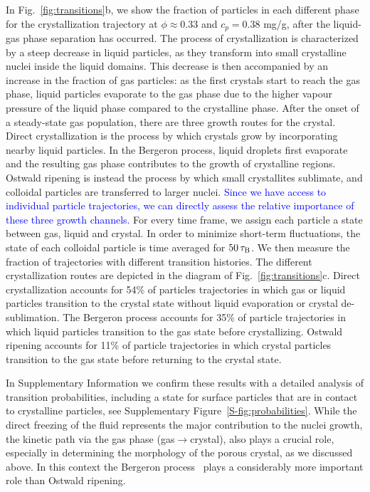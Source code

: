 \documentclass[preprint,amsmath,amssymb,superscriptaddress]{revtex4-1}
\begin{document}
In Fig.~\ref{fig:transitions}b, we show  the fraction of particles in each different phase for the crystallization trajectory at
$\phi\approx 0.33$ and $c_p=0.38$ mg/g, after the liquid-gas phase separation has occurred.
The process of crystallization is characterized 
by a steep decrease in liquid particles, as they transform into small crystalline nuclei inside the liquid domains. This decrease
is then accompanied by an increase in the fraction of gas particles: as the first crystals start to reach the gas phase, liquid particles evaporate 
to the gas phase due to the higher vapour pressure of the liquid phase compared to the crystalline phase. 
After the onset of a steady-state gas population, there are three growth routes for the crystal. 
Direct crystallization is the process by which crystals grow by incorporating nearby liquid particles. 
In the Bergeron process, liquid droplets first evaporate and the resulting gas phase contributes to the growth of crystalline regions. Ostwald ripening is instead the process by which small crystallites sublimate, and colloidal particles are transferred to larger nuclei.
\textcolor{blue}{Since we have access to individual particle trajectories, we can directly assess the relative importance of these three growth channels.}
For every time frame, we assign each particle a state between gas, liquid and crystal. In order to minimize short-term fluctuations, the state of each colloidal particle is time averaged for $50\,\tau_{\rm B}$. We then measure the fraction of trajectories with different transition histories.
The different crystallization routes are depicted in the diagram of Fig.~\ref{fig:transitions}c.
Direct crystallization accounts for 54\% of particles trajectories in which gas or liquid particles transition to the crystal state without liquid evaporation or crystal de-sublimation. 
The Bergeron process accounts for 35\% of particle trajectories in which liquid particles transition to the gas state before crystallizing. 
Ostwald ripening accounts for 11\% of particle trajectories in which crystal particles transition to the gas state before returning to the crystal state. 


In Supplementary Information we confirm these results with a detailed analysis of transition probabilities, including a state for surface particles that are in contact 
to crystalline particles, see Supplementary Figure~\ref{S-fig:probabilities}.
While the direct freezing of the fluid represents the major contribution to the nuclei growth, the kinetic path via the gas phase (gas$\rightarrow$crystal), also plays a crucial role,
especially in determining the morphology of the porous crystal, as we discussed above. In this context the Bergeron process~\cite{glickman2000glossary,morrison2012resilience}
plays a considerably more important role than Ostwald ripening.
\end{document}
